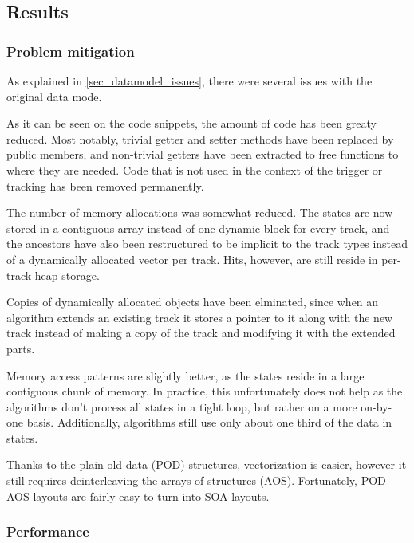 \documentclass[12pt]{article}
\begin{document}
\subsection{Results}

\subsubsection{Problem mitigation}

As explained in \ref{sec_datamodel_issues}, there were several issues with the original data mode.

\vspace{1pc}
As it can be seen on the code snippets, the amount of code has been greaty reduced. Most notably, trivial getter and setter methods have been replaced by public members, and non-trivial getters have been extracted to free functions to where they are needed. Code that is not used in the context of the trigger or tracking has been removed permanently.

\vspace{1pc}
The number of memory allocations was somewhat reduced. The states are now stored in a contiguous array instead of one dynamic block for every track, and the ancestors have also been restructured to be implicit to the track types instead of a dynamically allocated vector per track. Hits, however, are still reside in per-track heap storage.

\vspace{1pc}
Copies of dynamically allocated objects have been elminated, since when an algorithm extends an existing track it stores a pointer to it along with the new track instead of making a copy of the track and modifying it with the extended parts.

\vspace{1pc}
Memory access patterns are slightly better, as the states reside in a large contiguous chunk of memory. In practice, this unfortunately does not help as the algorithms don't process all states in a tight loop, but rather on a more on-by-one basis. Additionally, algorithms still use only about one third of the data in states.

\vspace{1pc}
Thanks to the plain old data (POD) structures, vectorization is easier, however it still requires deinterleaving the arrays of structures (AOS). Fortunately, POD AOS layouts are fairly easy to turn into SOA layouts.


\subsubsection{Performance}
\end{document}
